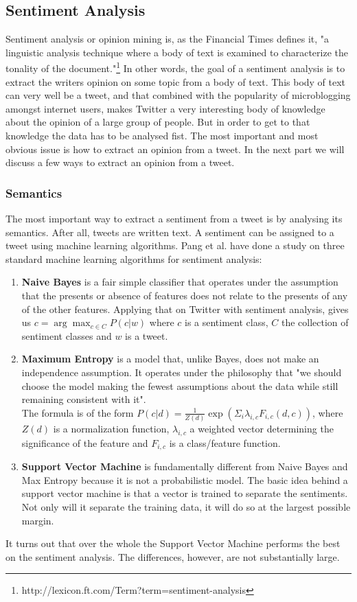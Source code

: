 \documentclass{article}
\begin{document}
\subsection{Sentiment Analysis}
Sentiment analysis or opinion mining is, as the Financial Times defines it, "a linguistic analysis technique where a body of text is examined to characterize the tonality of the document."\footnote{http://lexicon.ft.com/Term?term=sentiment-analysis} In other words, the goal of a sentiment analysis is to extract the writers opinion on some topic from a body of text. This body of text can very well be a tweet, and that combined with the popularity of microblogging amongst internet users, makes Twitter a very interesting body of knowledge about the opinion of a large group of people. But in order to get to that knowledge the data has to be analysed fist. 
The most important and most obvious issue is how to extract an opinion from a tweet. In the next part we will discuss a few ways to extract an opinion from a tweet.
\subsubsection*{Semantics }
The most important way to extract a sentiment from a tweet is by analysing its semantics. After all, tweets are written text. A sentiment can be assigned to a tweet using machine learning algorithms. Pang et al. \cite{machineLearning} have done a study on three standard machine learning algorithms for sentiment analysis: 
\begin{enumerate}
\item \textbf{Naive Bayes} is a fair simple classifier that operates under the assumption that the presents or absence of features does not relate to the presents of any of the other features. Applying that on Twitter with sentiment analysis, gives us $c = \arg\max_{c\in C} P(c|w)$ where $c$ is a sentiment class, $C$ the collection of sentiment classes and $w$ is a tweet. \cite{sentAnalysis}
\item \textbf{Maximum Entropy} is a model that, unlike Bayes, does not make an independence assumption. It operates under the philosophy that "we should choose the model making the fewest assumptions about the data while still remaining consistent with it".\cite{machineLearning} \\
The formula is of the form $P(c|d) = \frac{1}{Z(d)}\exp(\Sigma_i \lambda_{i,c}F_{i,c}(d,c))$, where $Z(d)$ is a normalization function, $\lambda_{i,c}$ a weighted vector determining the significance of the feature and $F_{i,c}$ is a class/feature function. 
\item \textbf{Support Vector Machine} is fundamentally different from Naive Bayes and Max Entropy because it is not a probabilistic model. The basic idea behind a support vector machine is that a vector is trained to separate the sentiments. Not only will it separate the training data, it will do so at the largest possible margin. 
\end{enumerate}
It turns out that over the whole the Support Vector Machine performs the best on the sentiment analysis\cite{machineLearning}. The differences, however, are not substantially large. 
\end{document}
